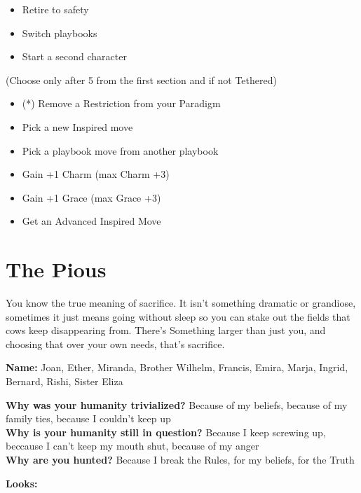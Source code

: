 \documentclass[10pt,twoside,openright]{memoir}
\begin{document}
\begin{itemize}
\tightlist
\item
  Retire to safety
\item
  Switch playbooks
\item
  Start a second character
\end{itemize}

(Choose only after 5 from the first section and if not Tethered)

\begin{itemize}
\tightlist
\item
  (*) Remove a Restriction from your Paradigm
\item
  Pick a new Inspired move
\item
  Pick a playbook move from another playbook
\item
  Gain +1 Charm (max Charm +3)
\item
  Gain +1 Grace (max Grace +3)
\item
  Get an Advanced Inspired Move
\end{itemize}

\newpage

\hypertarget{the-pious}{%
\section{The Pious}\label{the-pious}}

You know the true meaning of sacrifice. It isn't something dramatic or
grandiose, sometimes it just means going without sleep so you can stake
out the fields that cows keep disappearing from. There's Something
larger than just you, and choosing that over your own needs, that's
sacrifice.

\textbf{Name:} Joan, Ether, Miranda, Brother Wilhelm, Francis, Emira,
Marja, Ingrid, Bernard, Rishi, Sister Eliza

\textbf{Why was your humanity trivialized?} Because of my beliefs,
because of my family ties, because I couldn't keep up\\
\textbf{Why is your humanity still in question?} Because I keep screwing
up, beccause I can't keep my mouth shut, because of my anger\\
\textbf{Why are you hunted?} Because I break the Rules, for my beliefs,
for the Truth

\textbf{Looks:}
\end{document}
